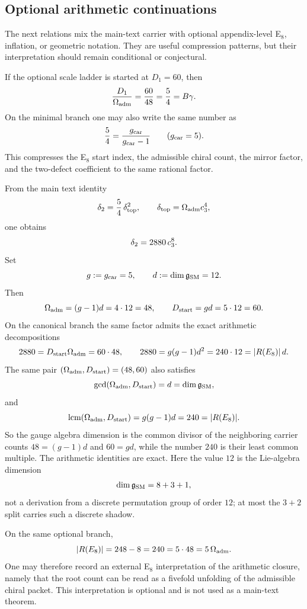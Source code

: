 \subsection{Optional arithmetic continuations}

The next relations mix the main-text carrier with optional appendix-level E$_8$, inflation, or geometric notation. They are useful compression patterns, but their interpretation should remain conditional or conjectural.

\begin{remark}
If the optional scale ladder is started at $D_1=60$, then
\[
\frac{D_1}{\Omega_{\mathrm{adm}}}=\frac{60}{48}=\frac54=B\gamma.
\]
On the minimal branch one may also write the same number as
\[
\frac54=\frac{g_{\mathrm{car}}}{g_{\mathrm{car}}-1}\qquad (g_{\mathrm{car}}=5).
\]
This compresses the E$_8$ start index, the admissible chiral count, the mirror factor, and the two-defect coefficient to the same rational factor.
\end{remark}

\begin{corollary}\label{rem:defect-factorization-gcd-lcm}
From the main text identity
\[
\delta_2=\frac{5}{4}\,\delta_{\mathrm{top}}^2,
\qquad
\delta_{\mathrm{top}}=\Omega_{\mathrm{adm}}c_3^4,
\]
one obtains
\[
\delta_2=2880\,c_3^8.
\]
Set
\[
g:=g_{\mathrm{car}}=5,
\qquad
d:=\dim\mathfrak g_{\mathrm{SM}}=12.
\]
Then
\[
\Omega_{\mathrm{adm}}=(g-1)d=4\cdot 12=48,
\qquad
D_{\mathrm{start}}=gd=5\cdot 12=60.
\]
On the canonical branch the same factor admits the exact arithmetic decompositions
\[
2880=D_{\mathrm{start}}\Omega_{\mathrm{adm}}=60\cdot48,
\qquad
2880=g(g-1)d^2=240\cdot12=|R(E_8)|\,d.
\]
The same pair $(\Omega_{\mathrm{adm}},D_{\mathrm{start}})=(48,60)$ also satisfies
\[
\gcd(\Omega_{\mathrm{adm}},D_{\mathrm{start}})
=
d=\dim \mathfrak g_{\mathrm{SM}},
\]
and
\[
\operatorname{lcm}(\Omega_{\mathrm{adm}},D_{\mathrm{start}})
=
g(g-1)d
=
240
=
|R(E_8)|.
\]
So the gauge algebra dimension is the common divisor of the neighboring carrier counts
$48=(g-1)d$ and $60=gd$, while the number $240$ is their least common multiple. The arithmetic
identities are exact. Here the value $12$ is the Lie-algebra dimension
\[
\dim\mathfrak g_{\mathrm{SM}}=8+3+1,
\]
not a derivation from a discrete permutation group of order $12$; at most the $3+2$ split carries
such a discrete shadow.
\end{corollary}

\begin{remark}
On the same optional branch,
\[
|R(E_8)|=248-8=240=5\cdot48=5\,\Omega_{\mathrm{adm}}.
\]
One may therefore record an external E$_8$ interpretation of the arithmetic closure, namely that
the root count can be read as a fivefold unfolding of the admissible chiral packet. This
interpretation is optional and is not used as a main-text theorem.
\end{remark}

